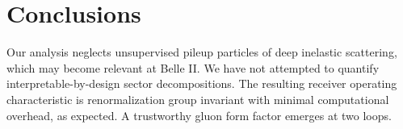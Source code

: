 \section{Conclusions}\label{sec:conclusions}

Our analysis neglects unsupervised pileup particles of deep inelastic
scattering, which may become relevant at Belle II. We have not attempted
to quantify interpretable-by-design sector decompositions. The resulting
receiver operating characteristic is renormalization group invariant
with minimal computational overhead, as expected. A trustworthy gluon
form factor emerges at two loops.

